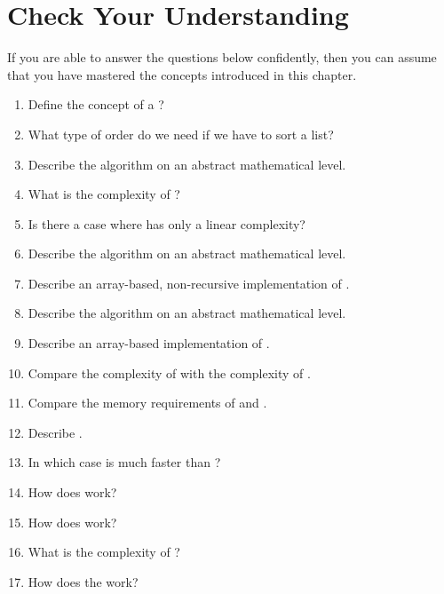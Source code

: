 \section{Check Your Understanding}
If you are able to answer the questions below confidently, then you can assume that you have mastered the concepts
introduced in this chapter.
\begin{enumerate}
\item Define the concept of a ?
\item What type of order do we need if we have to sort a list?
\item Describe the algorithm  on an abstract mathematical level.
\item What is the complexity of ?
\item Is there a case where   has only a linear complexity?
\item Describe the algorithm  on an abstract mathematical level.
\item Describe an array-based, non-recursive implementation of .
\item Describe the algorithm  on an abstract mathematical level.
\item Describe an array-based implementation of .
\item Compare the complexity of  with the complexity of .
\item Compare the memory requirements of  and .
\item Describe .
\item In which case is  much faster than ?
\item How does  work?
\item How does  work?
\item What is the complexity of ?
\item How does the  work?
\end{enumerate}

